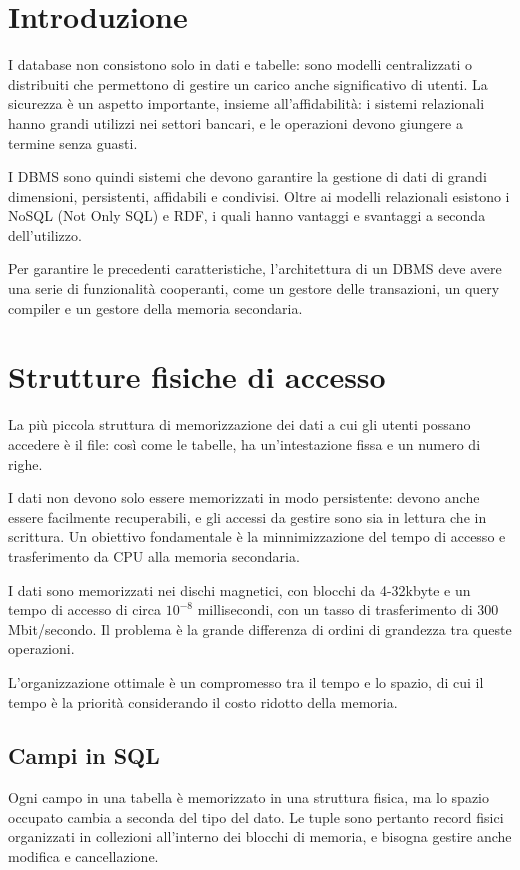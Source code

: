\section{Introduzione}
I database non consistono solo in dati e tabelle: sono modelli centralizzati o distribuiti che permettono di gestire un carico anche significativo di utenti. La sicurezza è un aspetto importante, insieme all'affidabilità: i sistemi relazionali hanno grandi utilizzi nei settori bancari, e le operazioni devono giungere a termine senza guasti.

I DBMS sono quindi sistemi che devono garantire la gestione di dati di grandi dimensioni, persistenti, affidabili e condivisi. Oltre ai modelli relazionali esistono i NoSQL (Not Only SQL) e RDF, i quali hanno vantaggi e svantaggi a seconda dell'utilizzo.

Per garantire le precedenti caratteristiche, l'architettura di un DBMS deve avere una serie di funzionalità cooperanti, come un gestore delle transazioni, un query compiler e un gestore della memoria secondaria.

\section{Strutture fisiche di accesso}
La più piccola struttura di memorizzazione dei dati a cui gli utenti possano accedere è il file: così come le tabelle, ha un'intestazione fissa e un numero di righe.

I dati non devono solo essere memorizzati in modo persistente: devono anche essere facilmente recuperabili, e gli accessi da gestire sono sia in lettura che in scrittura. Un obiettivo fondamentale è la minnimizzazione del tempo di accesso e trasferimento da CPU alla memoria secondaria.

I dati sono memorizzati nei dischi magnetici, con blocchi da 4-32kbyte e un tempo di accesso di circa $10^{-8}$ millisecondi, con un tasso di trasferimento di 300 Mbit/secondo. Il problema è la grande differenza di ordini di grandezza tra queste operazioni.

L'organizzazione ottimale è un compromesso tra il tempo e lo spazio, di cui il tempo è la priorità considerando il costo ridotto della memoria. 

\subsection{Campi in SQL}
Ogni campo in una tabella è memorizzato in una struttura fisica, ma lo spazio occupato cambia a seconda del tipo del dato. Le tuple sono pertanto record fisici organizzati in collezioni all'interno dei blocchi di memoria, e bisogna gestire anche modifica e cancellazione.

